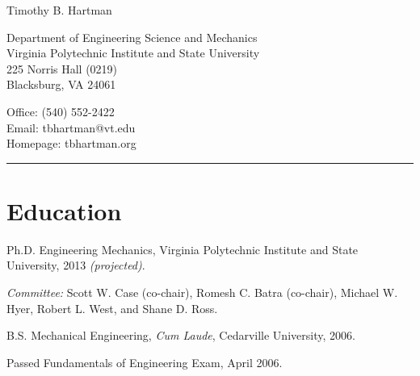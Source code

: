 \documentclass[10pt,letterpaper]{article}
\newcommand\name{Timothy B. Hartman}
\renewenvironment{itemize}{
  \begin{list}{}{
    \setlength{\leftmargin}{1.5em}
    \setlength{\itemsep}{0.25em}
    \setlength{\parskip}{0pt}
    \setlength{\parsep}{0.25em}
  }
}{
  \end{list}
}
\begin{document}
{\huge \name}


\bigskip

\begin{minipage}[t]{0.5\textwidth}
  Department of Engineering Science and Mechanics \\
  Virginia Polytechnic Institute and State University \\
  225 Norris Hall (0219) \\
  Blacksburg, VA 24061
\end{minipage}
\begin{minipage}[t]{0.5\textwidth}
  Office: (540) 552-2422 \\
  Email: tbhartman@vt.edu \\
  Homepage: tbhartman.org
\end{minipage}

\vspace{12pt}

\rule{\textwidth}{1pt}

%
%

\section*{Education}

\begin{itemize}
    \item Ph.D. Engineering Mechanics, Virginia Polytechnic Institute and State University, 2013 \textit{(projected)}.
    \begin{itemize}
        \item \textit{Committee:}
        Scott W. Case (co-chair), Romesh C. Batra (co-chair), Michael W. Hyer, Robert L. West, and Shane D. Ross.
    \end{itemize}
    \item B.S. Mechanical Engineering, \textit{Cum Laude}, Cedarville University, 2006.
    \begin{itemize}
        \item Passed Fundamentals of Engineering Exam, April 2006.
    \end{itemize}
\end{itemize}
\end{document}
